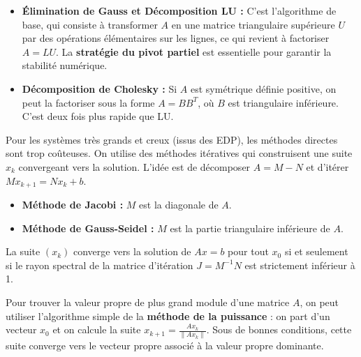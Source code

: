 \begin{proposition}[Méthodes Directes pour $Ax=b$]
    \begin{itemize}
        \item \textbf{Élimination de Gauss et Décomposition LU :} C'est l'algorithme de base, qui consiste à transformer $A$ en une matrice triangulaire supérieure $U$ par des opérations élémentaires sur les lignes, ce qui revient à factoriser $A=LU$. La \textbf{stratégie du pivot partiel} est essentielle pour garantir la stabilité numérique.
        \item \textbf{Décomposition de Cholesky :} Si $A$ est symétrique définie positive, on peut la factoriser sous la forme $A=B B^T$, où $B$ est triangulaire inférieure. C'est deux fois plus rapide que LU.
    \end{itemize}
\end{proposition}

\begin{theorem}[Méthodes Itératives pour $Ax=b$]
    Pour les systèmes très grands et creux (issus des EDP), les méthodes directes sont trop coûteuses. On utilise des méthodes itératives qui construisent une suite $x_k$ convergeant vers la solution. L'idée est de décomposer $A=M-N$ et d'itérer $M x_{k+1} = N x_k + b$.
    \begin{itemize}
        \item \textbf{Méthode de Jacobi :} $M$ est la diagonale de $A$.
        \item \textbf{Méthode de Gauss-Seidel :} $M$ est la partie triangulaire inférieure de $A$.
    \end{itemize}
\end{theorem}

\begin{theorem}
    La suite $(x_k)$ converge vers la solution de $Ax=b$ pour tout $x_0$ si et seulement si le rayon spectral de la matrice d'itération $J=M^{-1}N$ est strictement inférieur à 1.
\end{theorem}

\begin{application}
    Pour trouver la valeur propre de plus grand module d'une matrice $A$, on peut utiliser l'algorithme simple de la \textbf{méthode de la puissance} : on part d'un vecteur $x_0$ et on calcule la suite $x_{k+1} = \frac{A x_k}{\|A x_k\|}$. Sous de bonnes conditions, cette suite converge vers le vecteur propre associé à la valeur propre dominante.
\end{application}